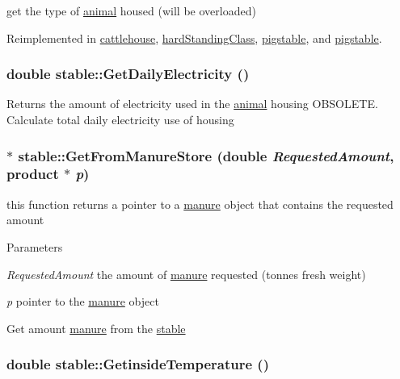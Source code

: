 get the type of \hyperlink{classanimal}{animal} housed (will be overloaded) 

Reimplemented in \hyperlink{classcattlehouse_ab4c837c538894c34c19d7a1cf23ce09f}{cattlehouse}, \hyperlink{classhard_standing_class_a3fb5297a67e0d2af40b940c22e2d2408}{hardStandingClass}, \hyperlink{classpigstable_af4e59e6d7864795569365be2ccdd2d6b}{pigstable}, and \hyperlink{classpigstable_a1078430122dd7afe16b4294b9b969467}{pigstable}.\hypertarget{classstable_a44baa21fe350cee62d66a5c3b29b8878}{
\subsubsection[{GetDailyElectricity}]{\setlength{\rightskip}{0pt plus 5cm}double stable::GetDailyElectricity ()}}
\label{classstable_a44baa21fe350cee62d66a5c3b29b8878}


Returns the amount of electricity used in the \hyperlink{classanimal}{animal} housing OBSOLETE. Calculate total daily electricity use of housing \hypertarget{classstable_a3de6b97449e7f4a58ffad4690d81831a}{
\subsubsection[{GetFromManureStore}]{ $\ast$ stable::GetFromManureStore (double {\em RequestedAmount}, \/  {\bf product} $\ast$ {\em p})}}
\label{classstable_a3de6b97449e7f4a58ffad4690d81831a}


this function returns a pointer to a \hyperlink{classmanure}{manure} object that contains the requested amount 
\begin{DoxyParams}{Parameters}
\item[{\em RequestedAmount}]the amount of \hyperlink{classmanure}{manure} requested (tonnes fresh weight) \item[{\em p}]pointer to the \hyperlink{classmanure}{manure} object\end{DoxyParams}
Get amount \hyperlink{classmanure}{manure} from the \hyperlink{classstable}{stable} \hypertarget{classstable_a88a9be2c3fbd2c04e64339dfc9794661}{
\subsubsection[{GetinsideTemperature}]{\setlength{\rightskip}{0pt plus 5cm}double stable::GetinsideTemperature ()}}
\label{classstable_a88a9be2c3fbd2c04e64339dfc9794661}


